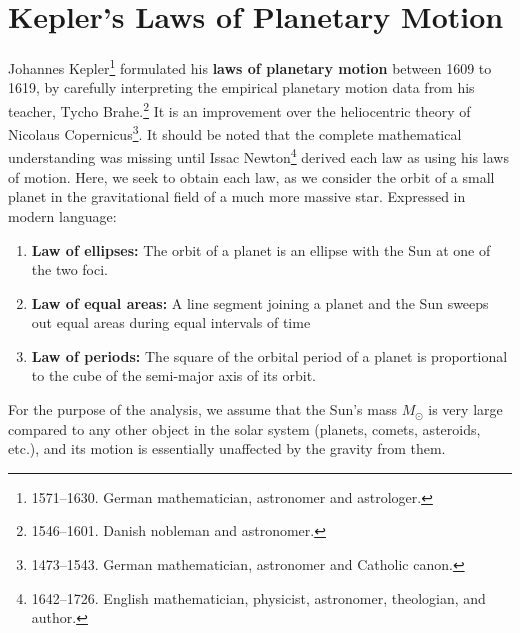 \section{Kepler's Laws of Planetary Motion}

Johannes Kepler\footnote{1571--1630. German mathematician, astronomer and
  astrologer.} formulated his \textbf{laws of planetary motion}
between 1609 to 1619, by carefully interpreting the empirical planetary motion
data from his teacher, Tycho Brahe.\footnote{1546--1601. Danish nobleman and
  astronomer.} It is an improvement over the heliocentric
theory of Nicolaus Copernicus\footnote{1473--1543. German mathematician,
  astronomer and Catholic canon.}. It should be noted that the complete
mathematical understanding was missing until Issac Newton\footnote{1642--1726.
  English mathematician, physicist, astronomer, theologian, and author.}
derived each law as using his laws of motion. Here, we seek to obtain
each law, as we consider the orbit of a small planet in the gravitational field
of a much more massive star. Expressed in modern language:
\begin{enumerate}
\item\textbf{Law of ellipses:} The orbit of a planet is an ellipse with the
  Sun at one of the two foci.
\item\textbf{Law of equal areas:} A line segment joining a planet and the Sun
  sweeps out equal areas during equal intervals of time
\item \textbf{Law of periods:} The square of the orbital period of a planet
  is proportional to the cube of the semi-major axis of its orbit.
\end{enumerate}
For the purpose of the analysis, we assume that the Sun's mass $M_\odot$
is very large compared to any other object in the solar system (planets,
comets, asteroids, etc.), and its motion is essentially unaffected by the
gravity from them.



